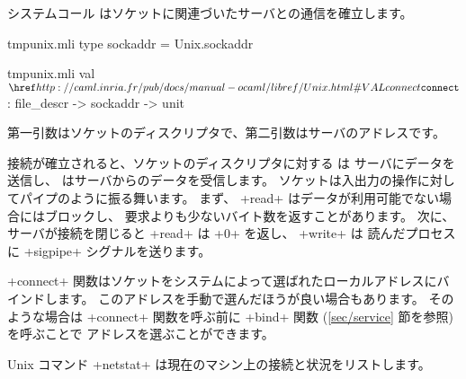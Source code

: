 システムコール  はソケットに関連づいたサーバとの通信を確立します。
%
\begin{codefile}{tmpunix.mli}
type sockaddr = Unix.sockaddr
\end{codefile}
%
\begin{listingcodefile}{tmpunix.mli}
val $\libvalue{Unix}{connect}$ : file_descr -> sockaddr -> unit
\end{listingcodefile}
%
第一引数はソケットのディスクリプタで、第二引数はサーバのアドレスです。

接続が確立されると、ソケットのディスクリプタに対する  は
サーバにデータを送信し、 はサーバからのデータを受信します。
ソケットは入出力の操作に対してパイプのように振る舞います。
まず、 \ml+read+ はデータが利用可能でない場合にはブロックし、
要求よりも少ないバイト数を返すことがあります。
次に、サーバが接続を閉じると \ml+read+ は \ml+0+ を返し、 \ml+write+ は
読んだプロセスに \ml+sigpipe+ シグナルを送ります。

\ml+connect+ 関数はソケットをシステムによって選ばれたローカルアドレスにバインドします。
このアドレスを手動で選んだほうが良い場合もあります。
そのような場合は \ml+connect+ 関数を呼ぶ前に \ml+bind+ 関数 (\ref{sec/service} 節を参照) を呼ぶことで
アドレスを選ぶことができます。

Unix コマンド \ml+netstat+ は現在のマシン上の接続と状況をリストします。


